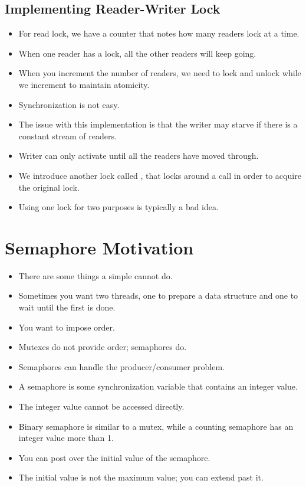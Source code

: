 \documentclass[]{article}
\begin{document}
\subsection{Implementing Reader-Writer Lock}
\begin{itemize}
\item For read lock, we have a counter that notes how many readers lock at a
time.
\item When one reader has a lock, all the other readers will keep going.
\item When you increment the number of readers, we need to lock and unlock while
we increment to maintain atomicity.
\item Synchronization is not easy.
\item The issue with this implementation is that the writer may starve if there
is a constant stream of readers.
\item Writer can only activate until all the readers have moved through.
\item We introduce another lock called , that locks around a
 call in order to acquire the original lock.
\item Using one lock for two purposes is typically a bad idea.
\end{itemize}

\section{Semaphore Motivation}
\begin{itemize}
\item There are some things a simple  cannot do.
\item Sometimes you want two threads, one to prepare a data structure and one to
wait until the first is done.
\item You want to impose order.
\item Mutexes do not provide order; semaphores do.
\item Semaphores can handle the producer/consumer problem.
\item A semaphore is some synchronization variable that contains an integer
value.
\item The integer value cannot be accessed directly.
\item Binary semaphore is similar to a mutex, while a counting semaphore has an
integer value more than 1.
\item You can post over the initial value of the semaphore.
\item The initial value is not the maximum value; you can extend past it.
\end{itemize}
\end{document}
